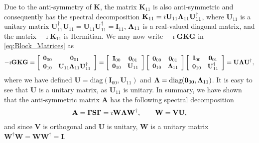 \documentclass[11pt]{amsart}
\newcommand{\Kb}{\mathbf{K}}
\newcommand{\Ib}{\mathbf{I}}
\newcommand{\Sb}{\mathbf{S}}
\newcommand{\Ab}{\mathbf{A}}
\newcommand{\Ob}{\mathbf{0}}
\newcommand{\Vb}{\mathbf{V}}
\newcommand{\Wb}{\mathbf{W}}
\newcommand{\Gb}{\mathbf{G}}
\newcommand{\Ub}{\mathbf{U}}
\newcommand\bGamma{\mbox{\boldmath${\Gamma}$}}
\newcommand\bLambda{\mbox{\boldmath${\Lambda}$}}
\begin{document}
Due to the anti-symmetry of $\Kb$, the matrix $\Kb_{11}$ is also
anti-symmetric and consequently has the spectral decomposition
$\Kb_{11}=\imath\Ub_{11}\bLambda_{11}\Ub_{11}^\dagger$, where $\Ub_{11}$ is a
unitary matrix $\Ub_{11}^\dagger\Ub_{11}=\Ub_{11}\Ub_{11}^\dagger=\Ib_{11}$,
$\bLambda_{11}$ is a real-valued diagonal matrix, and the matrix  
$-\imath\Kb_{11}$ is Hermitian. We may now write $-\imath\Gb\Kb\Gb$ in
\eqref{eq:Block_Matrices} as    
% 
\begin{align}\label{eq:Eig_Block_Matrices}
%
-\imath\Gb\Kb\Gb=\left[
  \begin{array}{ccc}
    \Ob_{00}&\Ob_{01}\\
    \Ob_{10}&\Ub_{11}\bLambda_{11}\Ub_{11}^\dagger   
    \end{array}
\right]
=
\left[
  \begin{array}{ccc}
    \Ib_{00}&\Ob_{01}\\
    \Ob_{10}&\Ub_{11}  
    \end{array}
\right]
%
\left[
  \begin{array}{ccc}
    \Ob_{00}&\Ob_{01}\\
    \Ob_{10}&\bLambda_{11}
    \end{array}
\right]
%
\left[
  \begin{array}{ccc}
    \Ib_{00}&\Ob_{01}\\
    \Ob_{10}&\Ub_{11}^\dagger  
    \end{array}
\right]
=\Ub\bLambda\Ub^\dagger,
\end{align}
%
where we have defined $\Ub=\text{diag}(\Ib_{00},\Ub_{11})$ and
$\bLambda=\text{diag}(\Ob_{00},\bLambda_{11})$. It is easy to see that
$\Ub$ is a unitary matrix, as $\Ub_{11}$ is unitary. In summary, we
have shown that the anti-symmetric matrix $\Ab$ has the following
spectral decomposition
%
\begin{align}\label{eq:Eig_Decomp_Kb}
  \Ab=\bGamma\Sb\bGamma=\imath\Wb\bLambda\Wb^\dagger, \qquad
  \Wb=\Vb\Ub,
\end{align}
%
and since $\Vb$ is orthogonal and $\Ub$ is unitary, $\Wb$ is a unitary
matrix $\Wb^\dagger\Wb=\Wb\Wb^\dagger=\Ib$.   
\end{document}
